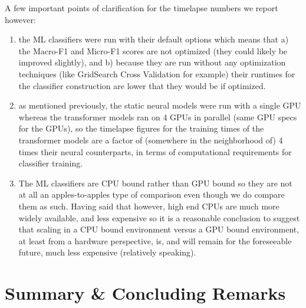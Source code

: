 \documentclass[final]{clv2025}
\begin{document}
A few important points of clarification for the timelapse numbers we report however:
\begin{enumerate}
\item the ML classifiers were run with their default options which means that a) the Macro-F1 and Micro-F1 scores are not optimized (they could likely be improved slightly), and b) because they are run without any optimization techniques (like GridSearch Cross Validation for example) their runtimes for the classifier construction are lower that they would be if optimized.
\item 	as mentioned previously, the static neural models were run with a single GPU whereas the transformer models ran on 4 GPUs in parallel (same GPU specs for the GPUs), so the timelapse figures for the training times of the transformer models are a factor of (somewhere in the neighborhood of) 4 times their neural counterparts, in terms of computational requirements for classifier training.
\item 	The ML classifiers are CPU bound rather than GPU bound so they are not at all an apples-to-apples type of comparison even though we do compare them as such. Having said that however, high end CPUs are much more widely available, and less expensive so it is a reasonable conclusion to suggest that scaling in a CPU bound environment versus a GPU bound environment, at least from a hardware perspective, is, and will remain for the foreseeable future, much less expensive (relatively speaking).
\end{enumerate}

\section{Summary \& Concluding Remarks}
\end{document}
